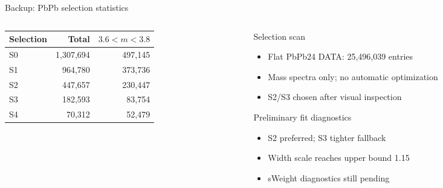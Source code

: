\begin{frame}{Backup: PbPb \texorpdfstring{\psiP}{psi(2S)} selection statistics}
  \begin{columns}[T]
    \begin{column}{0.48\textwidth}
      \vspace{4pt}
      \begin{center}
        \begin{tabular}{lrr}
          \toprule
          Selection & Total & $3.6<m<3.8$ \\
          \midrule
          S0 & 1,307,694 & 497,145 \\
          S1 & 964,780   & 373,736 \\
          S2 & 447,657   & 230,447 \\
          S3 & 182,593   & 83,754 \\
          S4 & 70,312    & 52,479 \\
          \bottomrule
        \end{tabular}
      \end{center}
    \end{column}
    \begin{column}{0.48\textwidth}
      \begin{block}{Selection scan}
        \begin{itemize}
          \item Flat PbPb24 DATA: 25,496,039 entries
          \item Mass spectra only; no automatic optimization
          \item S2/S3 chosen after visual inspection
        \end{itemize}
      \end{block}
      \begin{alertblock}{Preliminary fit diagnostics}
        \begin{itemize}
          \item S2 preferred; S3 tighter fallback
          \item Width scale reaches upper bound 1.15
          \item sWeight diagnostics still pending
        \end{itemize}
      \end{alertblock}
    \end{column}
  \end{columns}
\end{frame}
